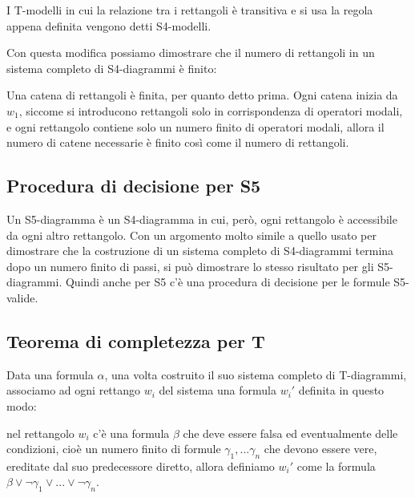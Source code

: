 \documentclass[a4paper, titlepage, 12pt]{report}
\begin{document}
I T-modelli in cui la relazione tra i rettangoli è transitiva e si usa la regola
appena definita vengono detti S4-modelli.

Con questa modifica possiamo dimostrare che il numero di rettangoli in un sistema
completo di S4-diagrammi è finito:

Una catena di rettangoli è finita, per quanto detto prima.
Ogni catena inizia da $w_1$, siccome si introducono rettangoli
solo in corrispondenza di operatori modali, e ogni rettangolo contiene solo un numero finito
di operatori modali, allora il numero di catene necessarie è finito
così come il numero di rettangoli.

\subsection{Procedura di decisione per S5}
Un S5-diagramma è un S4-diagramma in cui, però, ogni rettangolo è accessibile
da ogni altro rettangolo. Con un argomento molto simile a quello usato
per dimostrare che la costruzione di un sistema completo di S4-diagrammi termina dopo
un numero finito di passi, si può dimostrare lo stesso risultato per gli S5-diagrammi.
Quindi anche per S5 c'è una procedura di decisione per le formule S5-valide.


\subsection{Teorema di completezza per T}
Data una formula $\alpha$, una volta costruito il suo sistema completo di T-diagrammi,
associamo ad ogni rettango $w_i$ del sistema una formula $w_i'$ definita in questo modo:

nel rettangolo $w_i$ c'è una formula $\beta$ che deve essere falsa ed eventualmente delle condizioni,
cioè un numero finito di formule $\gamma_1, ...\gamma_n$ che devono essere vere, ereditate
dal suo predecessore diretto, allora definiamo $w_i'$ come la formula
$\beta \lor \neg \gamma_1 \lor ... \lor \neg \gamma_n$.
\end{document}

